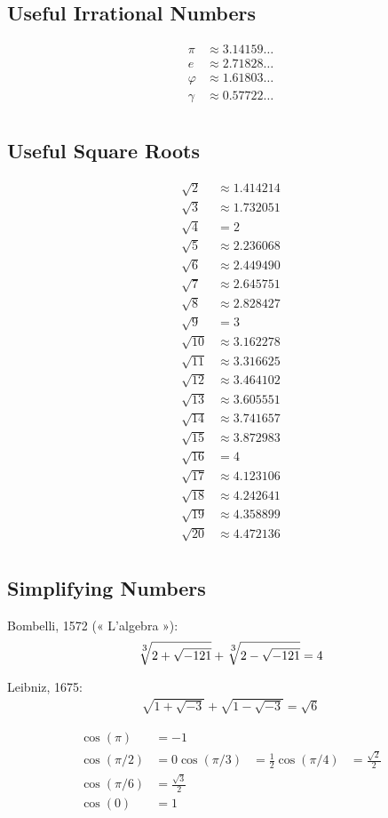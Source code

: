 \documentclass[12pt]{article}
\begin{document}
\newpage

\subsection*{Useful Irrational Numbers}
\begin{align*}
     \pi & \approx 3.14159 \ldots \\
       e & \approx 2.71828 \ldots \\
 \varphi & \approx 1.61803 \ldots \\
  \gamma & \approx 0.57722 \ldots \\
\end{align*}

\subsection*{Useful Square Roots}
\begin{align*}
 \sqrt{2} & \approx 1.414214 \\
 \sqrt{3} & \approx 1.732051 \\
 \sqrt{4} & = 2\\
 \sqrt{5} & \approx 2.236068 \\
 \sqrt{6} & \approx 2.449490 \\
 \sqrt{7} & \approx 2.645751 \\
 \sqrt{8} & \approx 2.828427 \\
 \sqrt{9} & = 3\\
\sqrt{10} & \approx 3.162278 \\
\sqrt{11} & \approx 3.316625 \\
\sqrt{12} & \approx 3.464102 \\
\sqrt{13} & \approx 3.605551 \\
\sqrt{14} & \approx 3.741657 \\
\sqrt{15} & \approx 3.872983 \\
\sqrt{16} & = 4\\
\sqrt{17} & \approx 4.123106 \\
\sqrt{18} & \approx 4.242641 \\
\sqrt{19} & \approx 4.358899 \\
\sqrt{20} & \approx 4.472136 \\
\end{align*}


\subsection*{Simplifying Numbers}
Bombelli, 1572 (« L'algebra »):
\begin{align*}
\sqrt[\leftroot{-1}\uproot{2}\scriptstyle 3]{2 + \sqrt{-121}}
+ \sqrt[\leftroot{-1}\uproot{2}\scriptstyle 3]{2 - \sqrt{-121}}
= 4
\end{align*}

Leibniz, 1675:
\begin{align*}
\sqrt{1 + \sqrt{-3}}
+ \sqrt{1 - \sqrt{-3}}
= \sqrt{6}
\end{align*}


\begin{align*}
\cos(\pi) 
& = -1
\\
\cos(\pi/2) 
& = 0
\cos(\pi/3) 
& = \frac{1}{2}
\cos(\pi/4) 
& = \frac{\sqrt{2}}{2}
\\
\cos(\pi/6) 
& = \frac{\sqrt{3}}{2}
\\
\cos(0) 
& = 1
\end{align*}
\end{document}
